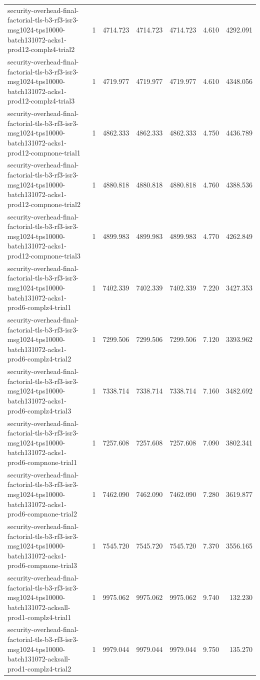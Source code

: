 \begin{tabular}{lrrrrrr}
security-overhead-final-factorial-tls-b3-rf3-isr3-msg1024-tps10000-batch131072-acks1-prod12-complz4-trial2 & 1 & 4714.723 & 4714.723 & 4714.723 & 4.610 & 4292.091 \\
security-overhead-final-factorial-tls-b3-rf3-isr3-msg1024-tps10000-batch131072-acks1-prod12-complz4-trial3 & 1 & 4719.977 & 4719.977 & 4719.977 & 4.610 & 4348.056 \\
security-overhead-final-factorial-tls-b3-rf3-isr3-msg1024-tps10000-batch131072-acks1-prod12-compnone-trial1 & 1 & 4862.333 & 4862.333 & 4862.333 & 4.750 & 4436.789 \\
security-overhead-final-factorial-tls-b3-rf3-isr3-msg1024-tps10000-batch131072-acks1-prod12-compnone-trial2 & 1 & 4880.818 & 4880.818 & 4880.818 & 4.760 & 4388.536 \\
security-overhead-final-factorial-tls-b3-rf3-isr3-msg1024-tps10000-batch131072-acks1-prod12-compnone-trial3 & 1 & 4899.983 & 4899.983 & 4899.983 & 4.770 & 4262.849 \\
security-overhead-final-factorial-tls-b3-rf3-isr3-msg1024-tps10000-batch131072-acks1-prod6-complz4-trial1 & 1 & 7402.339 & 7402.339 & 7402.339 & 7.220 & 3427.353 \\
security-overhead-final-factorial-tls-b3-rf3-isr3-msg1024-tps10000-batch131072-acks1-prod6-complz4-trial2 & 1 & 7299.506 & 7299.506 & 7299.506 & 7.120 & 3393.962 \\
security-overhead-final-factorial-tls-b3-rf3-isr3-msg1024-tps10000-batch131072-acks1-prod6-complz4-trial3 & 1 & 7338.714 & 7338.714 & 7338.714 & 7.160 & 3482.692 \\
security-overhead-final-factorial-tls-b3-rf3-isr3-msg1024-tps10000-batch131072-acks1-prod6-compnone-trial1 & 1 & 7257.608 & 7257.608 & 7257.608 & 7.090 & 3802.341 \\
security-overhead-final-factorial-tls-b3-rf3-isr3-msg1024-tps10000-batch131072-acks1-prod6-compnone-trial2 & 1 & 7462.090 & 7462.090 & 7462.090 & 7.280 & 3619.877 \\
security-overhead-final-factorial-tls-b3-rf3-isr3-msg1024-tps10000-batch131072-acks1-prod6-compnone-trial3 & 1 & 7545.720 & 7545.720 & 7545.720 & 7.370 & 3556.165 \\
security-overhead-final-factorial-tls-b3-rf3-isr3-msg1024-tps10000-batch131072-acksall-prod1-complz4-trial1 & 1 & 9975.062 & 9975.062 & 9975.062 & 9.740 & 132.230 \\
security-overhead-final-factorial-tls-b3-rf3-isr3-msg1024-tps10000-batch131072-acksall-prod1-complz4-trial2 & 1 & 9979.044 & 9979.044 & 9979.044 & 9.750 & 135.270 \\

\end{tabular}
